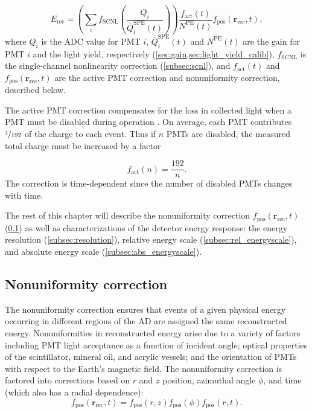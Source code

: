 \begin{equation}
    E_{\text{rec}} = \left(
        \sum_i f_{\text{SCNL}}\left(\frac{Q_i}{\overline{Q}_i^{\text{SPE}}(t)}\right)
    \right)
    \frac{f_{\text{act}}(t)}{N^{\text{PE}}(t)}
    f_{\text{pos}}(\textbf{r}_{\text{rec}},t),
\end{equation}
where $Q_i$ is the ADC value for PMT $i$,
$\overline{Q}_i^{\text{SPE}}(t)$ and $N^{\text{PE}}(t)$
are the gain for PMT $i$ and the light yield, respectively
(\cref{sec:gain,sec:light_yield_calib}),
$f_{\text{SCNL}}$ is the single-channel nonlinearity correction
(\cref{subsec:scnl}),
and $f_{\text{act}}(t)$ and $f_{\text{pos}}(\textbf{r}_{\text{rec}},t)$
are the active PMT correction and nonuniformity correction,
described below.

The active PMT correction compensates for the loss in collected light
when a PMT must be disabled during operation \cite{ngd2016}.
On average, each PMT contributes $\nicefrac{1}{192}$ of the charge to each event.
Thus if $n$ PMTs are disabled, the measured total charge must be increased by a factor

\begin{equation}
    f_{\text{act}}(n) = \frac{192}{n}.
\end{equation}
The correction is time-dependent since the number of disabled PMTs changes with time.

The rest of this chapter will describe the
nonuniformity correction $f_{\text{pos}}(\textbf{r}_{\text{rec}},t)$
(\cref{subsec:nonuniformity})
as well as characterizations of the detector energy response:
the energy resolution (\cref{subsec:resolution}),
relative energy scale (\cref{subsec:rel_energyscale}),
and absolute energy scale (\cref{subsec:abs_energyscale}).

\subsection{Nonuniformity correction}
\label{subsec:nonuniformity}

The nonuniformity correction ensures that events of a given physical energy
occurring in different regions of the AD
are assigned the same reconstructed energy.
Nonuniformities in reconstructed energy arise due to a variety of factors
including PMT light acceptance as a function of incident angle;
optical properties of the scintillator, mineral oil, and acrylic vessels;
and the orientation of PMTs with respect to the Earth's magnetic field.
The nonuniformity correction is factored into corrections based on
$r$ and $z$ position, azimuthal angle $\phi$, and time
(which also has a radial dependence):
\begin{equation}
    f_{\text{pos}}(\textbf{r}_{\text{rec}},t) =
    f_{\text{pos}}(r, z)f_{\text{pos}}(\phi)f_{\text{pos}}(r, t).
\end{equation}

